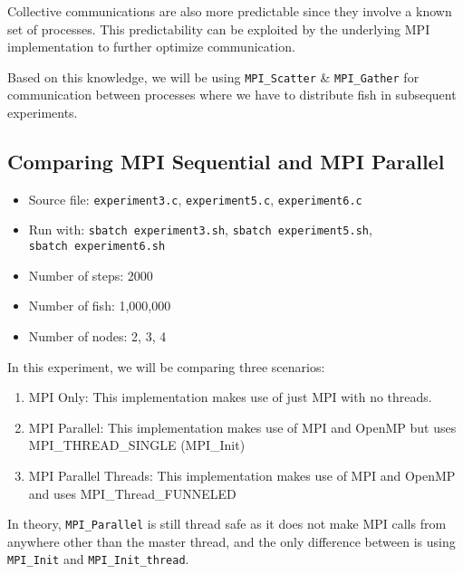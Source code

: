 \documentclass[
]{article}
\providecommand{\tightlist}{%
  \setlength{\itemsep}{0pt}\setlength{\parskip}{0pt}}
\begin{document}
Collective communications are also more predictable since they involve a
known set of processes. This predictability can be exploited by the
underlying MPI implementation to further optimize communication.

Based on this knowledge, we will be using \texttt{MPI\_Scatter} \&
\texttt{MPI\_Gather} for communication between processes where we have
to distribute fish in subsequent experiments.

\hypertarget{comparing-mpi-sequential-and-mpi-parallel}{%
\subsection{Comparing MPI Sequential and MPI
Parallel}\label{comparing-mpi-sequential-and-mpi-parallel}}

\begin{itemize}
\tightlist
\item
  Source file: \texttt{experiment3.c}, \texttt{experiment5.c},
  \texttt{experiment6.c}
\item
  Run with: \texttt{sbatch\ experiment3.sh},
  \texttt{sbatch\ experiment5.sh}, \texttt{sbatch\ experiment6.sh}
\item
  Number of steps: 2000
\item
  Number of fish: 1,000,000
\item
  Number of nodes: 2, 3, 4
\end{itemize}

In this experiment, we will be comparing three scenarios:

\begin{enumerate}
\def\labelenumi{\arabic{enumi}.}
\tightlist
\item
  MPI Only: This implementation makes use of just MPI with no threads.
\item
  MPI Parallel: This implementation makes use of MPI and OpenMP but uses
  MPI\_THREAD\_SINGLE (MPI\_Init)
\item
  MPI Parallel Threads: This implementation makes use of MPI and OpenMP
  and uses MPI\_Thread\_FUNNELED
\end{enumerate}

In theory, \texttt{MPI\_Parallel} is still thread safe as it does not
make MPI calls from anywhere other than the master thread, and the only
difference between is using \texttt{MPI\_Init} and
\texttt{MPI\_Init\_thread}.
\end{document}
